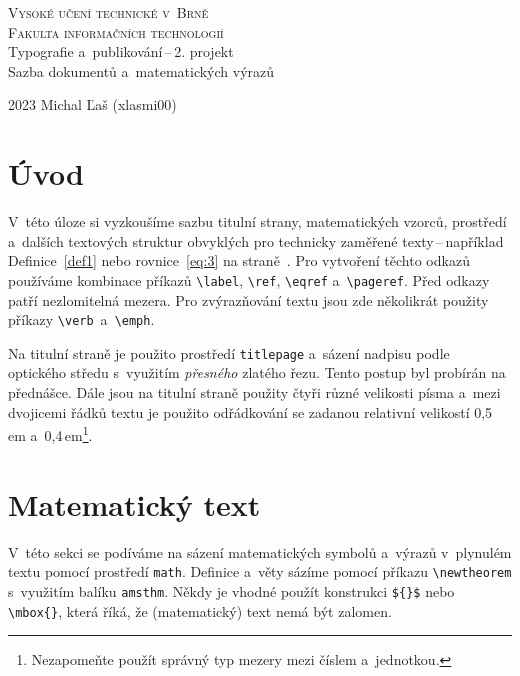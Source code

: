 \documentclass[twocolumn, 11pt, a4paper]{article}
\begin{document}
\begin{titlepage}
    \begin{center}
            \textsc{\Huge Vysoké učení technické v~Brně \\}
            \vspace{0.5em}
            \textsc{\huge Fakulta informačních technologií \\}
            {\LARGE Typografie a~publikování\,--\,2. projekt \\ 
            \vspace{0.4em}
            Sazba dokumentů a~matematických výrazů}
    \end{center}
    {\Large 2023 \hfill Michal Ľaš (xlasmi00)}
\end{titlepage}


\section*{Úvod}

V~této úloze si vyzkoušíme sazbu titulní strany, matematických vzorců, prostředí a~dalších textových struktur 
obvyklých pro technicky zaměřené texty\,--\,například Definice~\ref{def1} nebo rovnice~\eqref{eq:3} na straně~\pageref{eq:3}. Pro vytvoření těchto odkazů používáme 
kombinace příkazů \verb|\label|, \verb|\ref|, \verb|\eqref| a~\verb|\pageref|. Před odkazy patří nezlomitelná mezera. Pro zvýrazňování textu jsou zde 
několikrát použity příkazy \verb|\verb|~a~\verb|\emph|.

Na titulní straně je použito prostředí \verb|titlepage| a~sázení nadpisu podle 
optického středu s~využitím \emph{přesného} zlatého řezu. Tento postup byl probírán na přednášce. 
Dále jsou na titulní straně použity čtyři různé velikosti písma a~mezi dvojicemi řádků textu je použito 
odřádkování se zadanou relativní velikostí 0,5\,em a~0,4\,em\footnote{Nezapomeňte použít správný typ mezery mezi číslem a~jednotkou.}.

\section{Matematický text}

V~této sekci se podíváme na sázení matematických symbolů a~výrazů v~plynulém textu pomocí prostředí \verb|math|. 
Definice a~věty sázíme pomocí příkazu \verb|\newtheorem| s~využitím balíku \verb|amsthm|. Někdy je vhodné použít konstrukci 
\verb|${}$| nebo \verb|\mbox{}|, která říká, že (matematický) text nemá být zalomen.
\end{document}

